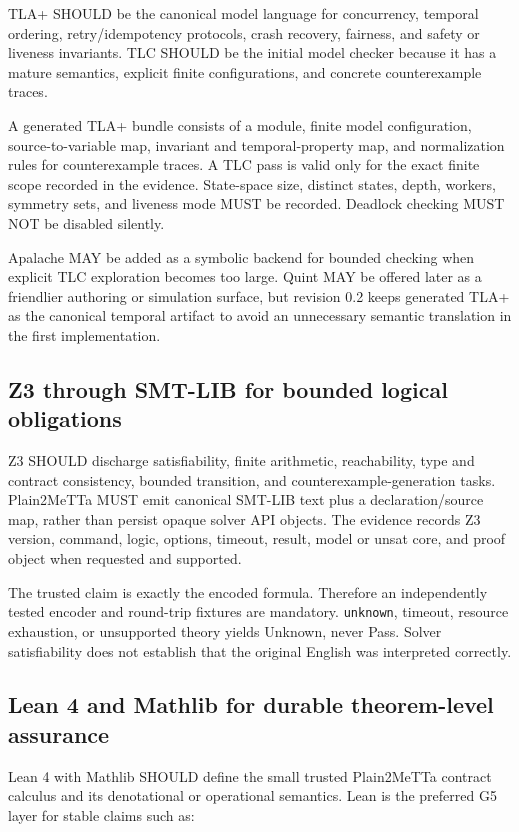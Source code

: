 \documentclass[10pt]{article}
\begin{document}
\begin{enumerate}
TLA+ SHOULD be the canonical model language for concurrency, temporal
ordering, retry/idempotency protocols, crash recovery, fairness, and safety or
liveness invariants.  TLC SHOULD be the initial model checker because it has a
mature semantics, explicit finite configurations, and concrete counterexample
traces.

A generated TLA+ bundle consists of a module, finite model configuration,
source-to-variable map, invariant and temporal-property map, and normalization
rules for counterexample traces.  A TLC pass is valid only for the exact finite
scope recorded in the evidence.  State-space size, distinct states, depth,
workers, symmetry sets, and liveness mode MUST be recorded.  Deadlock checking
MUST NOT be disabled silently.

Apalache MAY be added as a symbolic backend for bounded checking when explicit
TLC exploration becomes too large.  Quint MAY be offered later as a friendlier
authoring or simulation surface, but revision 0.2 keeps generated TLA+ as the
canonical temporal artifact to avoid an unnecessary semantic translation in
the first implementation.

\subsection{Z3 through SMT-LIB for bounded logical obligations}

Z3 SHOULD discharge satisfiability, finite arithmetic, reachability, type and
contract consistency, bounded transition, and counterexample-generation tasks.
Plain2MeTTa MUST emit canonical SMT-LIB text plus a declaration/source map,
rather than persist opaque solver API objects.  The evidence records Z3
version, command, logic, options, timeout, result, model or unsat core, and
proof object when requested and supported.

The trusted claim is exactly the encoded formula.  Therefore an independently
tested encoder and round-trip fixtures are mandatory.  \texttt{unknown},
timeout, resource exhaustion, or unsupported theory yields Unknown, never Pass.
Solver satisfiability does not establish that the original English was
interpreted correctly.

\subsection{Lean 4 and Mathlib for durable theorem-level assurance}

Lean 4 with Mathlib SHOULD define the small trusted Plain2MeTTa contract
calculus and its denotational or operational semantics.  Lean is the preferred
G5 layer for stable claims such as:


\end{enumerate}
\end{document}
